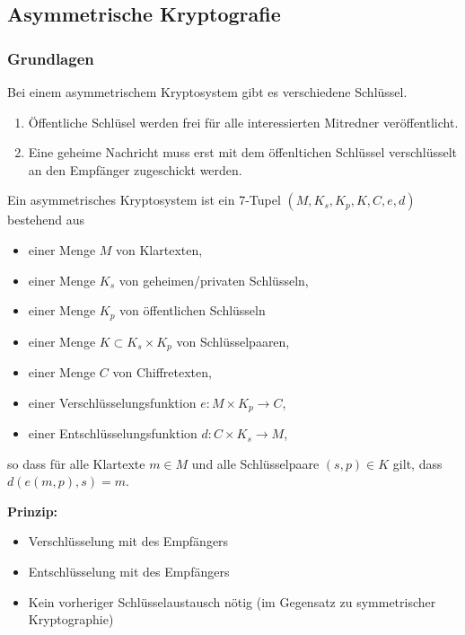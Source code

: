 \documentclass[
../../css_summary.tex,
]
{subfiles}
\begin{document}
\subsection{Asymmetrische Kryptografie}

\subsubsection{Grundlagen}

Bei einem asymmetrischem Kryptosystem gibt es verschiedene Schlüssel.
\begin{enumerate}
   \item Öffentliche Schlüsel werden frei für alle interessierten Mitredner veröffentlicht.
   \item Eine geheime Nachricht muss erst mit dem öffenltichen Schlüssel verschlüsselt an den Empfänger zugeschickt werden.
\end{enumerate}

\begin{defbox}
   Ein asymmetrisches Kryptosystem ist ein 7-Tupel $(M, K_s, K_p, K, C, e, d)$ bestehend aus
   \begin{itemize}
      \item einer Menge $M$ von Klartexten,
      \item einer Menge $K_s$ von geheimen/privaten Schlüsseln,
      \item einer Menge $K_p$ von öffentlichen Schlüsseln
      \item einer Menge $K \subset K_s \times K_p$ von Schlüsselpaaren,
      \item einer Menge $C$ von Chiffretexten,
      \item einer Verschlüsselungsfunktion $e: M \times K_p \rightarrow C$,
      \item einer Entschlüsselungsfunktion $d: C \times K_s \rightarrow M$,
   \end{itemize}
   so dass für alle Klartexte $m \in M$ und alle Schlüsselpaare $(s, p) \in K$ gilt, dass $d(e(m, p), s) = m$.
\end{defbox}

\noindent\textbf{Prinzip:}
\begin{itemize}
   \item Verschlüsselung mit  des Empfängers
   \item Entschlüsselung mit  des Empfängers
   \item Kein vorheriger Schlüsselaustausch nötig (im Gegensatz zu symmetrischer Kryptographie)
\end{itemize}
\end{document}
